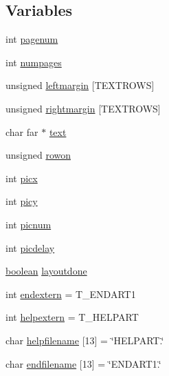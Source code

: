 \subsection*{Variables}
\begin{DoxyCompactItemize}
\item 
int \hyperlink{WL__TEXT_8C_ad303d1f16fd753775f930d896512b75b}{pagenum}
\item 
int \hyperlink{WL__TEXT_8C_a0d1c5e1299956c2f925c50afdcfd1c8c}{numpages}
\item 
unsigned \hyperlink{WL__TEXT_8C_a06fc12df6d11c1860bf3560e797f6a86}{leftmargin} \mbox{[}TEXTROWS\mbox{]}
\item 
unsigned \hyperlink{WL__TEXT_8C_af36828bfab1f6f383fd7fd82cbe4b1e4}{rightmargin} \mbox{[}TEXTROWS\mbox{]}
\item 
char far $\ast$ \hyperlink{WL__TEXT_8C_ae039e40005934b01c31fe5287625b253}{text}
\item 
unsigned \hyperlink{WL__TEXT_8C_ab98c4cafb5050f009ae5718c341753a0}{rowon}
\item 
int \hyperlink{WL__TEXT_8C_ad8c58e10d111b4a969c99d5ecfc3868f}{picx}
\item 
int \hyperlink{WL__TEXT_8C_a73b2a6aa834bbf7c38e798be716d1ea0}{picy}
\item 
int \hyperlink{WL__TEXT_8C_a38ee8916c0c328929ad672895daca6d6}{picnum}
\item 
int \hyperlink{WL__TEXT_8C_ab04a2daab21fa7d886fb269432a2af29}{picdelay}
\item 
\hyperlink{ID__HEAD_8H_a7c6368b321bd9acd0149b030bb8275ed}{boolean} \hyperlink{WL__TEXT_8C_a0755a01e7d94b21d0d57168ac818089e}{layoutdone}
\item 
int \hyperlink{WL__TEXT_8C_a9414485b9ffb5157a3d3469d1588fd2a}{endextern} = T\_\-ENDART1
\item 
int \hyperlink{WL__TEXT_8C_a910c7d3090fe5a0e86c16a2baddcb1c8}{helpextern} = T\_\-HELPART
\item 
char \hyperlink{WL__TEXT_8C_a305be2d1fe1747006daab18fa395fdae}{helpfilename} \mbox{[}13\mbox{]} = \char`\"{}HELPART.\char`\"{}
\item 
char \hyperlink{WL__TEXT_8C_ab0714dbebe80dcbdefd80f2f20800171}{endfilename} \mbox{[}13\mbox{]} = \char`\"{}ENDART1.\char`\"{}
\end{DoxyCompactItemize}



